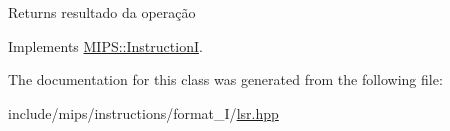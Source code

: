 \begin{DoxyReturn}{Returns}
resultado da operação 
\end{DoxyReturn}


Implements \hyperlink{classMIPS_1_1InstructionI_ae60fca5801bf5415cdff06d2aa11764f}{M\+I\+P\+S\+::\+InstructionI}.



The documentation for this class was generated from the following file\+:\begin{DoxyCompactItemize}
\item 
include/mips/instructions/format\+\_\+\+I/\hyperlink{lsr_8hpp}{lsr.\+hpp}\end{DoxyCompactItemize}
